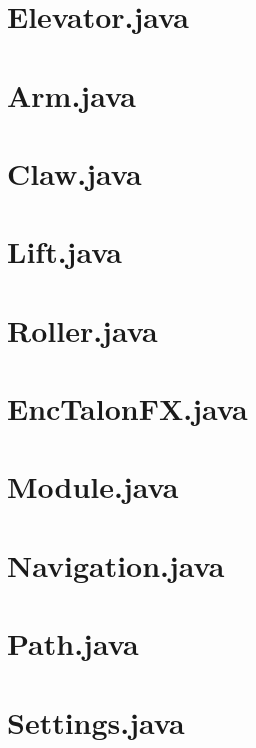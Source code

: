 \documentclass[letterpaper,10pt]{memoir}
\newcommand{\filelister}[1]{%
		
	}
\begin{document}
	\newpage\section*{Elevator.java}
	\filelister{Hardware/Elevator.java}

	\newpage\section*{Arm.java}
	\filelister{Elevator/Arm.java}

	\newpage\section*{Claw.java}
	\filelister{Elevator/Claw.java}

	\newpage\section*{Lift.java}
	\filelister{Elevator/Lift.java}

	\newpage\section*{Roller.java}
	\filelister{Elevator/Roller.java}

	\newpage\section*{EncTalonFX.java}
	\filelister{Hardware/EncTalonFX.java}

	\newpage\section*{Module.java}
	\filelister{Hardware/Module.java}

	\newpage\section*{Navigation.java}
	\filelister{Hardware/Navigation.java}

	\newpage\section*{Path.java}
	\filelister{Hardware/Path.java}

	\newpage\section*{Settings.java}
	\filelister{Hardware/Settings.java}
\end{document}
